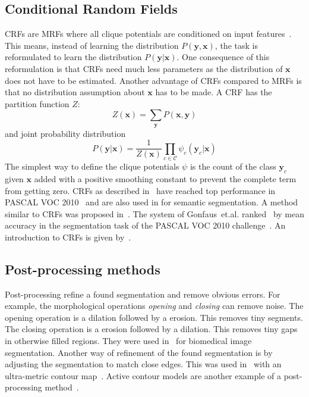 \documentclass[technote,a4paper,leqno]{IEEEtran}
\begin{document}
\subsection{Conditional Random Fields}\label{subsec:conditional-random-fields}
\Glspl{CRF} are \glspl{MRF} where all clique potentials are conditioned on
input features~\cite{murphy2012machine}. This means, instead of learning the
distribution $P(\mathbf{y}, \mathbf{x})$, the task is reformulated to learn the
distribution $P(\mathbf{y}| \mathbf{x})$. One consequence of this reformulation
is that \glspl{CRF} need much less parameters as the distribution of
$\mathbf{x}$ does not have to be estimated. Another advantage of \glspl{CRF}
compared to \glspl{MRF} is that no distribution assumption about $\mathbf{x}$
has to be made.
A \gls{CRF} has the partition function $Z$:
\[Z(\mathbf{x}) = \sum_{\mathbf{y}} P(\mathbf{x}, \mathbf{y})\]
and joint probability distribution
\[P(\mathbf{y} | \mathbf{x}) = \frac{1}{Z(\mathbf{x})} \prod_{c \in \mathcal{C}} \psi_c(\mathbf{y}_c | \mathbf{x})\]
The simplest way to define the clique potentials $\psi$ is the count of the
class $\mathbf{y}_c$ given $\mathbf{x}$ added with a positive smoothing
constant to prevent the complete term from getting zero.
\Glspl{CRF} as described in~\cite{associative09} have reached top performance
in PASCAL VOC 2010~\cite{VOC2010Results} and are also used in
\cite{multiscale04,shotton2006textonboost} for semantic segmentation.
A method similar to \glspl{CRF} was proposed in~\cite{gonfaus2010harmony}.
The system of Gonfaus~et.al. ranked~ by mean accuracy in the segmentation
task of the PASCAL VOC 2010 challenge~\cite{everingham2010pascal}.
An introduction to \glspl{CRF} is given by~\cite{sutton2011introduction}.
\subsection{Post-processing methods}\label{subsec:post-processing-methods}%
Post-processing refine a found segmentation and remove obvious
errors. For example, the morphological operations \textit{opening} and
\textit{closing} can remove noise. The opening operation is a dilation followed
by a erosion. This removes tiny segments. The closing operation is a erosion
followed by a dilation. This removes tiny gaps in otherwise filled regions.
They were used in~\cite{chen1998image} for biomedical image segmentation.
Another way of refinement of the found segmentation is by adjusting the
segmentation to match close edges. This was used in~\cite{brox2011object} with
an ultra-metric contour map~\cite{arbelaez2009contours}.
Active contour models are another example of a post-processing
method~\cite{kass1988snakes}.
\end{document}
